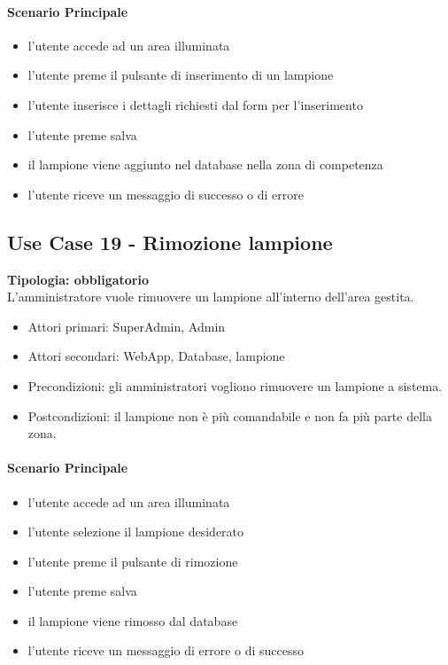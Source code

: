 \documentclass[12pt]{article}
\begin{document}
\paragraph{Scenario Principale}
\begin{itemize}
	\item l'utente accede ad un area illuminata
	\item l'utente preme il pulsante di inserimento di un lampione
	\item l'utente inserisce i dettagli richiesti dal form per l'inserimento
	\item l'utente preme salva
	\item il lampione viene aggiunto nel database nella zona di competenza
	\item l'utente riceve un messaggio di successo o di errore
\end{itemize}

\subsection{Use Case 19 - Rimozione lampione}
\textbf{Tipologia: obbligatorio}\\
L'amministratore vuole rimuovere un lampione all'interno dell'area gestita.
\begin{itemize}
	\item Attori primari: SuperAdmin, Admin
	\item Attori secondari: WebApp, Database, lampione
	\item Precondizioni: gli amministratori vogliono rimuovere un lampione a sistema.\\
	\item Postcondizioni: il lampione non è più comandabile e non fa più parte della zona.
\end{itemize}
\paragraph{Scenario Principale}
\begin{itemize}
	\item l'utente accede ad un area illuminata
	\item l'utente selezione il lampione desiderato
	\item l'utente preme il pulsante di rimozione
	\item l'utente preme salva
	\item il lampione viene rimosso dal database
	\item l'utente riceve un messaggio di errore o di successo
\end{itemize}
\end{document}
